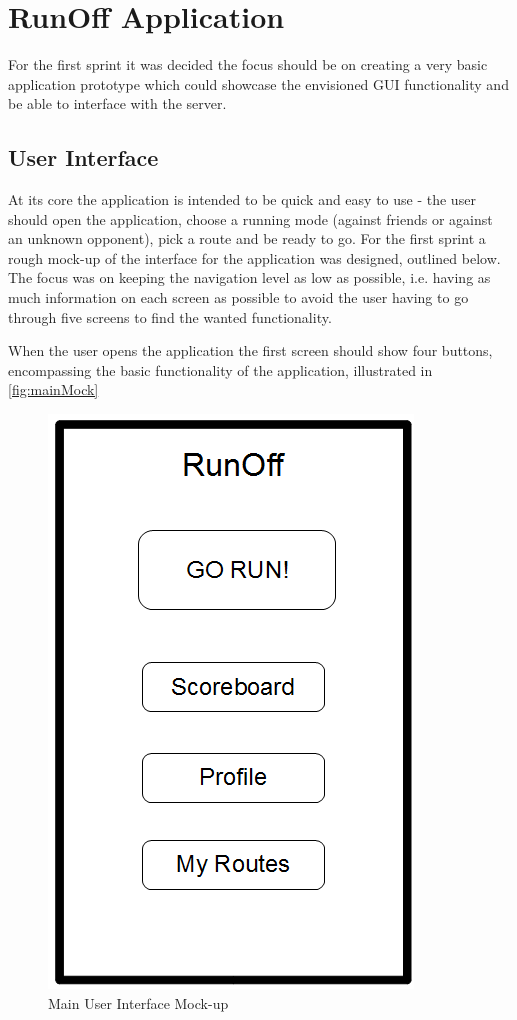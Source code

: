 \section{RunOff Application}
For the first sprint it was decided the focus should be on creating a very basic application prototype which could showcase the envisioned \ac{GUI} functionality and be able to interface with the server. 

\subsection{User Interface}
At its core the application is intended to be quick and easy to use - the user should open the application, choose a running mode (against friends or against an unknown opponent), pick a route and be ready to go. For the first sprint a rough mock-up of the interface for the application was designed, outlined below. The focus was on keeping the navigation level as low as possible, i.e. having as much information on each screen as possible to avoid the user having to go through five screens to find the wanted functionality.
\vspace{10pt}

When the user opens the application the first screen should show four buttons, encompassing the basic functionality of the application, illustrated in \autoref{fig:mainMock}


\begin{figure}[ht]
\begin{center}
 \caption{Main User Interface Mock-up}
 \label{fig:mainMock}
 \includegraphics[scale=0.4]{img/mainMockV1.png}
\end{center}
\end{figure}

